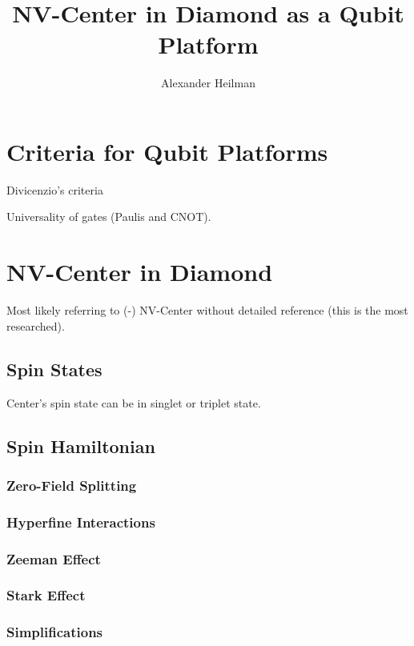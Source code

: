 \documentclass[10pt,a4paper]{article}
\title{NV-Center in Diamond as a Qubit Platform}
\author{Alexander Heilman}
\begin{document}
\vspace{-3cm}
 
\maketitle

\begin{multicols}{2}

\section{Criteria for Qubit Platforms}
Divicenzio's criteria

Universality of gates (Paulis and CNOT).

\section{NV-Center in Diamond}
Most likely referring to (-) NV-Center without detailed reference (this is the most researched). 

\subsection{Spin States}
Center's spin state can be in singlet or triplet state.

\subsection{Spin Hamiltonian}

\subsubsection{Zero-Field Splitting}

\subsubsection{Hyperfine Interactions}

\subsubsection{Zeeman Effect}

\subsubsection{Stark Effect}

\subsubsection{Simplifications}


\end{multicols}
\end{document}
